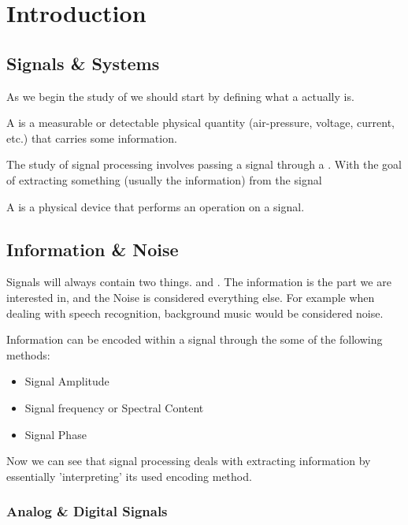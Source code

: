 \chapter{Introduction}

\section{Signals \& Systems}

As we begin the study of  we should start by defining what a  actually is. 

\begin{definition}
	A  is a measurable or detectable physical quantity (air-pressure, voltage, current, etc.) that carries some information.
\end{definition}

The study of signal processing involves passing a signal through a . With the goal of extracting something (usually the information) from the signal
\begin{definition}
	A  is a physical device that performs an operation on a signal.
\end{definition}

\section{Information \& Noise}
Signals will always contain two things.  and . The information is the part we are interested in, and the Noise is considered everything else. For example when dealing with speech recognition, background music would be considered noise.

Information can be encoded within a signal through the some of the following methods:
\begin{itemize}
	\item Signal Amplitude
	\item Signal frequency or Spectral Content
	\item Signal Phase
\end{itemize}

Now we can see that signal processing deals with extracting information by essentially 'interpreting' its used encoding method.

\subsection*{Analog \& Digital Signals}

